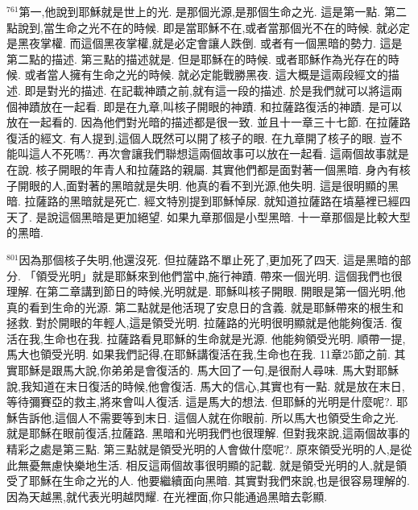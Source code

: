 \documentclass{book}
\begin{document}
$^{761}$第一,他說到耶穌就是世上的光.
是那個光源,是那個生命之光.
這是第一點.
第二點說到,當生命之光不在的時候.
即是當耶穌不在,或者當那個光不在的時候.
就必定是黑夜掌權.
而這個黑夜掌權,就是必定會讓人跌倒.
或者有一個黑暗的勢力.
這是第二點的描述.
第三點的描述就是.
但是耶穌在的時候.
或者耶穌作為光存在的時候.
或者當人擁有生命之光的時候.
就必定能戰勝黑夜.
這大概是這兩段經文的描述.
即是對光的描述.
在記載神蹟之前,就有這一段的描述.
於是我們就可以將這兩個神蹟放在一起看.
即是在九章,叫核子開眼的神蹟.
和拉薩路復活的神蹟.
是可以放在一起看的.
因為他們對光暗的描述都是很一致.
並且十一章三十七節.
在拉薩路復活的經文.
有人提到,這個人既然可以開了核子的眼.
在九章開了核子的眼.
豈不能叫這人不死嗎?.
再次會讓我們聯想這兩個故事可以放在一起看.
這兩個故事就是在說.
核子開眼的年青人和拉薩路的親屬.
其實他們都是面對著一個黑暗.
身內有核子開眼的人,面對著的黑暗就是失明.
他真的看不到光源,他失明.
這是很明顯的黑暗.
拉薩路的黑暗就是死亡.
經文特別提到耶穌悼尿.
就知道拉薩路在墳墓裡已經四天了.
是說這個黑暗是更加絕望.
如果九章那個是小型黑暗.
十一章那個是比較大型的黑暗.

$^{801}$因為那個核子失明,他還沒死.
但拉薩路不單止死了,更加死了四天.
這是黑暗的部分.
「領受光明」就是耶穌來到他們當中,施行神蹟.
帶來一個光明.
這個我們也很理解.
在第二章講到節日的時候,光明就是.
耶穌叫核子開眼.
開眼是第一個光明,他真的看到生命的光源.
第二點就是他活現了安息日的含義.
就是耶穌帶來的根生和拯救.
對於開眼的年輕人,這是領受光明.
拉薩路的光明很明顯就是他能夠復活.
復活在我,生命也在我.
拉薩路看見耶穌的生命就是光源.
他能夠領受光明.
順帶一提,馬大也領受光明.
如果我們記得,在耶穌講復活在我,生命也在我.
11章25節之前.
其實耶穌是跟馬大說,你弟弟是會復活的.
馬大回了一句,是很耐人尋味.
馬大對耶穌說,我知道在末日復活的時候,他會復活.
馬大的信心,其實也有一點.
就是放在末日,等待彌賽亞的救主,將來會叫人復活.
這是馬大的想法.
但耶穌的光明是什麼呢?.
耶穌告訴他,這個人不需要等到末日.
這個人就在你眼前.
所以馬大也領受生命之光.
就是耶穌在眼前復活,拉薩路.
黑暗和光明我們也很理解.
但對我來說,這兩個故事的精彩之處是第三點.
第三點就是領受光明的人會做什麼呢?.
原來領受光明的人,是從此無憂無慮快樂地生活.
相反這兩個故事很明顯的記載.
就是領受光明的人,就是領受了耶穌在生命之光的人.
他要繼續面向黑暗.
其實對我們來說,也是很容易理解的.
因為天越黑,就代表光明越閃耀.
在光裡面,你只能通過黑暗去彰顯.
\end{document}
